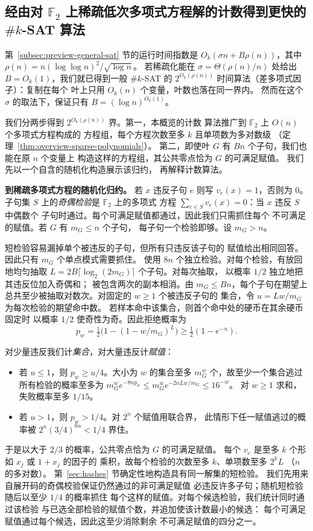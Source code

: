 \subsection{经由对 \texorpdfstring{$\mathbb F_2$}{F\_2} 上稀疏低次多项式方程解的计数得到更快的 \texorpdfstring{$\#k$-SAT}{\#k-SAT} 算法}
\label{subsec:preview-full-case}

第~\ref{subsec:preview-general-sat} 节的运行时间指数是
$O_k(\sigma n+B\rho(n))$，其中
$\rho(n)=n(\log\log n)^2/\sqrt{\log n}$。
若稀疏化能在 $\sigma=\Theta(\rho(n)/n)$ 处给出
$B=O_k(1)$，我们就已得到一般 $\#k$-SAT 的
$2^{O_k(\rho(n))}$ 时间算法（差多项式因子）：复制在每个
叶上只用 $O_k(n)$ 个变量，叶数也落在同一界内。
然而在这个 $\sigma$ 的取法下，保证只有
$B=(\log n)^{O_k(1)}$。

我们分两步得到 $2^{O_k(\rho(n))}$ 界。第一，本概览的计数
算法推广到 $\mathbb F_2$ 上 $O(n)$ 个多项式方程构成的
方程组，每个方程次数至多 $k$ 且单项数为多对数级
（定理~\ref{thm:overview-sparse-polynomials}）。
第二，即使叶 $G$ 有 $Bn$ 个子句，我们也能在原 $n$ 个变量上
构造这样的方程组，其公共零点恰为 $G$ 的可满足赋值。
我们先以一个自含的随机化构造展示该归约，
再解释计数算法。

\medskip\noindent
\textbf{到稀疏多项式方程的随机化归约。}
若 $x$ 违反子句 $e$ 则写 $v_e(x)=1$，否则为 $0$。
子句集 $S$ 上的\emph{奇偶检验}是 $\mathbb F_2$ 上的多项式
方程 $\sum_{e\in S}v_e(x)=0$：当 $x$ 违反 $S$ 中偶数个
子句时通过。每个可满足赋值都通过，因此我们只需抓住每个
不可满足的赋值。若 $G$ 有 $m_G\le n$ 个子句，
每子句一个检验即够。设 $m_G>n$。

短检验容易漏掉单个被违反的子句，但所有只违反该子句的
赋值给出相同回答。因此只有 $m_G$ 个单点模式需要抓住。
使用 $8n$ 个独立检验。对每个检验，有放回地均匀抽取
$L=2B\lceil\log_2(2m_G)\rceil$ 个子句。对每次抽取，
以概率 $1/2$ 独立地把其违反位加入奇偶和；
被包含两次的副本相消。由 $m_G\le Bn$，每个子句在期望上
总共至少被抽取对数次。对固定的 $w\ge1$ 个被违反子句的
集合，令 $u=Lw/m_G$ 为每次检验的期望命中数。
若样本命中该集合，则首个命中处的硬币在其余硬币固定时
以概率 $1/2$ 使奇性为奇。因此拒绝概率为
\[
 p_w=\tfrac12\bigl(1-(1-w/m_G)^L\bigr)\ge\tfrac12(1-e^{-u}).
\]

对少量违反我们计\emph{集合}，对大量违反计\emph{赋值}：
\begin{itemize}
\item 若 $u\le1$，则 $p_w\ge u/4$。大小为 $w$ 的集合至多
$m_G^w$ 个，故至少一个集合逃过所有检验的概率至多为
$m_G^w e^{-8np_w}\le m_G^w e^{-2nLw/m_G}\le16^{-w}$。
对 $w\ge1$ 求和，失败概率至多 $1/15$。
\item 若 $u>1$，则 $p_w>1/4$。对 $2^n$ 个赋值用联合界，
此情形下任一赋值逃过的概率被
$2^n(3/4)^{8n}<1/4$ 界住。
\end{itemize}
于是以大于 $2/3$ 的概率，公共零点恰为 $G$ 的可满足赋值。
每个 $v_e$ 是至多 $k$ 个形如 $x_j$ 或 $1+x_j$ 的因子的
乘积，故每个检验的次数至多 $k$、单项数至多 $2^kL$
（$n$ 的多对数）。
第~\ref{sec:hashes} 节确定性地构造具有同一解集的短检验。
我们先用来自展开码的奇偶校验保证仍然通过的非可满足赋值
必违反许多子句；随机短检验随后以至少 $1/4$ 的概率抓住
每个这样的赋值。对每个候选检验，我们统计同时通过该检验
与已选全部检验的赋值个数，并追加使该计数最小的候选：
每个可满足赋值通过每个候选，因此这至少消除剩余
不可满足赋值的四分之一。

